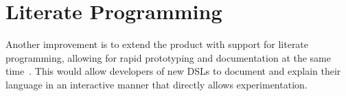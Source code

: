\section{Literate Programming}
\label{sec:literate-programming}
Another improvement is to extend the product with support for literate
programming, allowing for rapid prototyping and documentation at the
same time~\cite{schulte2012}. This would allow developers of new DSLs
to document and explain their language in an interactive manner that
directly allows experimentation.

